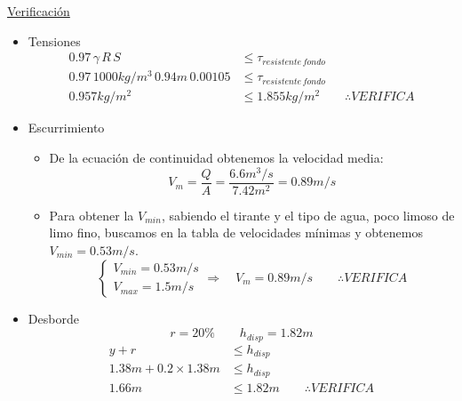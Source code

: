\underline{Verificación}

\begin{itemize}
 \item Tensiones
    \begin{align*}
    0.97 \, \gamma \, R \, S &\leq \tau_{resistente\,fondo} \\
    0.97 \, 1000 kg/m^3 \, 0.94 m \, 0.00105 &\leq \tau_{resistente\,fondo} \\
    0.957 kg/m^2 &\leq 1.855 kg/m^2
    \qquad
    \therefore VERIFICA 
    \end{align*}

  \item Escurrimiento
    \begin{itemize}
    \item De la ecuación de continuidad obtenemos la velocidad media:
	\begin{equation*}
	V_{m} = \dfrac{Q}{A} = \dfrac{6.6 m^3/s}{7.42 m^2} = 0.89 m/s
	\end{equation*}
    \item Para obtener la $V_{min}$, sabiendo el tirante y el tipo de agua, poco limoso de limo fino, buscamos en
    la tabla de velocidades mínimas y obtenemos $V_{min} = 0.53 m/s$.
	\begin{equation*}
	  \begin{cases}
	  V_{min} = 0.53 m/s \\
	  V_{max} = 1.5 m/s
	  \end{cases}
	  \Longrightarrow \quad
	  V_{m} = 0.89 m/s
	  \qquad
	  \therefore VERIFICA
	\end{equation*}
    \end{itemize}

 \item Desborde
    \begin{equation*}
    r = 20\%
    \qquad
    h_{disp} = 1.82 m
    \end{equation*}
    \begin{align*}
    y + r &\leq h_{disp} \\
    1.38 m + 0.2 \times 1.38 m &\leq h_{disp} \\
    1.66 m &\leq 1.82 m
    \qquad
    \therefore VERIFICA
    \end{align*}
\end{itemize}

